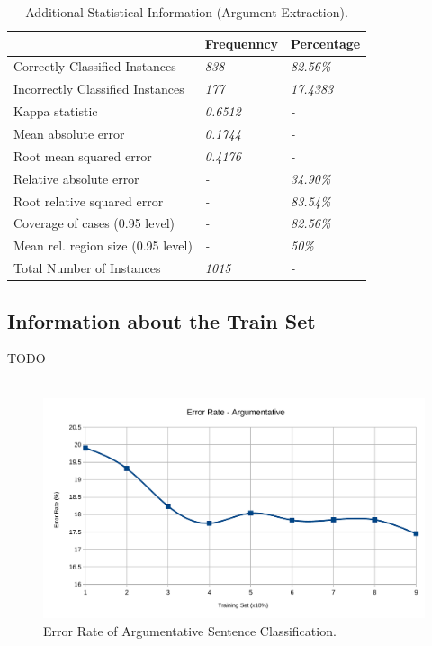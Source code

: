 \begin{table}[H]
\centering
\caption{Additional Statistical Information (Argument Extraction).}
\label{44_table_ref}
\begin{tabular}{lll}
\hline
                                   & {\bf Frequenncy} & {\bf Percentage} \\ \hline
Correctly Classified Instances     & {\it 838}        & {\it 82.56\%}    \\
Incorrectly Classified Instances   & {\it 177}        & {\it 17.4383}    \\
Kappa statistic                    & {\it 0.6512}     & {\it -}          \\
Mean absolute error                & {\it 0.1744}     & {\it -}          \\
Root mean squared error            & {\it 0.4176}     & {\it -}          \\
Relative absolute error            & {\it -}          & {\it 34.90\%}    \\
Root relative squared error        & {\it -}          & {\it 83.54\%}    \\
Coverage of cases (0.95 level)     & {\it -}          & {\it 82.56\%}    \\
Mean rel. region size (0.95 level) & {\it -}          & {\it 50\%}       \\
Total Number of Instances          & {\it 1015}       & {\it -}          \\ \hline
\end{tabular}
\end{table}


\subsection{Information about the Train Set}\label{413_ref}
TODO\\
\\

\begin{figure}[H]
\centering
\includegraphics[width=1\linewidth]{figure/arguments/errorRate-argumentative}
\caption{Error Rate of Argumentative Sentence Classification.}
\end{figure}

